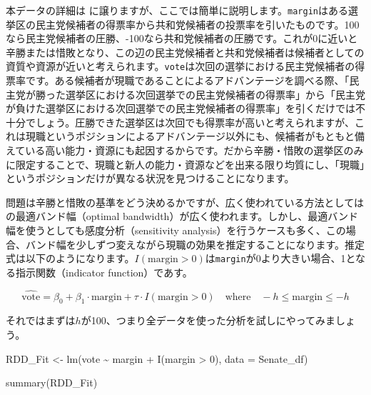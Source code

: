 \documentclass[
  a4paper,
  pandoc,
  ja=standard,
  jafont=haranoaji]{bxjsbook}
\newenvironment{Shaded}{\begin{snugshade}}{\end{snugshade}}
\newcommand{\AttributeTok}[1]{\textcolor[rgb]{0.00,0.48,0.65}{#1}}
\newcommand{\DecValTok}[1]{\textcolor[rgb]{0.68,0.00,0.00}{#1}}
\newcommand{\FunctionTok}[1]{\textcolor[rgb]{0.28,0.35,0.67}{#1}}
\newcommand{\NormalTok}[1]{\textcolor[rgb]{0.00,0.48,0.65}{#1}}
\newcommand{\OtherTok}[1]{\textcolor[rgb]{0.00,0.48,0.65}{#1}}
\newcommand{\SpecialCharTok}[1]{\textcolor[rgb]{0.37,0.37,0.37}{#1}}
\begin{document}
本データの詳細は \citet{Cattaneo_Frandsen_Titiunik:2015}
に譲りますが、ここでは簡単に説明します。\texttt{margin}はある選挙区の民主党候補者の得票率から共和党候補者の投票率を引いたものです。100なら民主党候補者の圧勝、-100なら共和党候補者の圧勝です。これが0に近いと辛勝または惜敗となり、この辺の民主党候補者と共和党候補者は候補者としての資質や資源が近いと考えられます。\texttt{vote}は次回の選挙における民主党候補者の得票率です。ある候補者が現職であることによるアドバンテージを調べる際、「民主党が勝った選挙区における次回選挙での民主党候補者の得票率」から「民主党が負けた選挙区における次回選挙での民主党候補者の得票率」を引くだけでは不十分でしょう。圧勝できた選挙区は次回でも得票率が高いと考えられますが、これは現職というポジションによるアドバンテージ以外にも、候補者がもともと備えている高い能力・資源にも起因するからです。だから辛勝・惜敗の選挙区のみに限定することで、現職と新人の能力・資源などを出来る限り均質にし、「現職」というポジションだけが異なる状況を見つけることになります。

問題は辛勝と惜敗の基準をどう決めるかですが、広く使われている方法としては
\citet{Imbens_Kalyanaraman:2012} の最適バンド幅（optimal
bandwidth）が広く使われます。しかし、最適バンド幅を使うとしても感度分析（sensitivity
analysis）を行うケースも多く、この場合、バンド幅を少しずつ変えながら現職の効果を推定することになります。推定式は以下のようになります。\(I(\text{margin} > 0)\)は\texttt{margin}が0より大きい場合、1となる指示関数（indicator
function）であす。

\[
\hat{\text{vote}} = \beta_0 + \beta_1 \cdot \text{margin} + \tau \cdot I(\text{margin} > 0) \quad \text{where} \quad -h \leq \text{margin} \leq -h
\]

それではまずは\(h\)が100、つまり全データを使った分析を試しにやってみましょう。

\begin{Shaded}
\begin{Highlighting}[numbers=left,,]
\NormalTok{RDD\_Fit }\OtherTok{\textless{}{-}} \FunctionTok{lm}\NormalTok{(vote }\SpecialCharTok{\textasciitilde{}}\NormalTok{ margin }\SpecialCharTok{+} \FunctionTok{I}\NormalTok{(margin }\SpecialCharTok{\textgreater{}} \DecValTok{0}\NormalTok{), }\AttributeTok{data =}\NormalTok{ Senate\_df)}

\FunctionTok{summary}\NormalTok{(RDD\_Fit)}
\end{Highlighting}
\end{Shaded}
\end{document}
